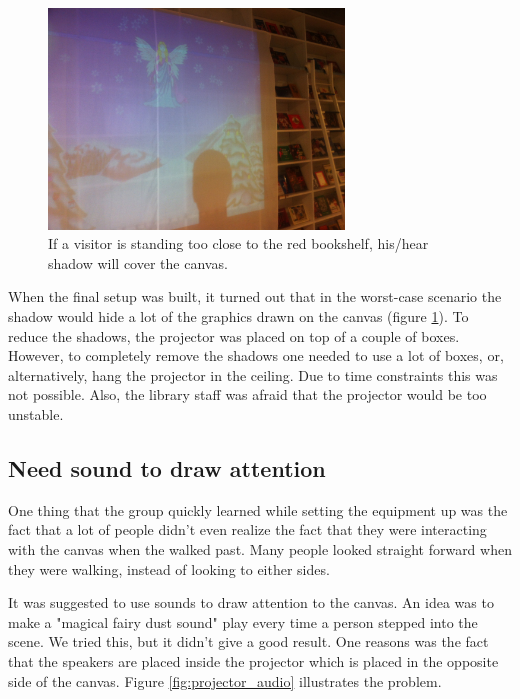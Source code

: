 \begin{figure}[htbp]
\centering
\includegraphics[width=0.70\textwidth]{Pictures/Design/shadow}
\caption{If a visitor is standing too close to the red bookshelf, his/hear shadow will cover the canvas.}
\label{fig:shadow_canvas}
\end{figure}

When the final setup was built, it turned out that in the worst-case scenario the shadow would hide a lot of the graphics drawn on the canvas (figure \ref{fig:shadow_canvas}). To reduce the shadows, the projector was placed on top of a couple of boxes. However, to completely remove the shadows one needed to use a lot of boxes, or, alternatively, hang the projector in the ceiling. Due to time constraints this was not possible. Also, the library staff was afraid that the projector would be too unstable.

\subsection{Need sound to draw attention}
One thing that the group quickly learned while setting the equipment up was the fact that a lot of people didn't even realize the fact that they were interacting with the canvas when the walked past. Many people looked straight forward when they were walking, instead of looking to either sides.

It was suggested to use sounds to draw attention to the canvas. An idea was to make a "magical fairy dust sound" play every time a person stepped into the scene. We tried this, but it didn't give a good result. One reasons was the fact that the speakers are placed inside the projector which is placed in the opposite side of the canvas. Figure \ref{fig:projector_audio} illustrates the problem.

